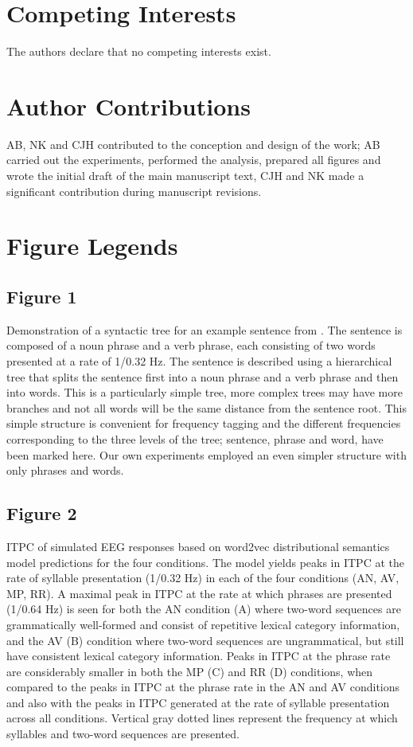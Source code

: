 \documentclass[10pt,letterpaper]{article}
\begin{document}
\section*{Competing Interests}
The authors declare that no competing interests exist.




\section*{Author Contributions}
AB, NK and CJH contributed to the conception and design of the work; AB carried out the experiments, performed the analysis, prepared all figures and wrote the initial draft of the main manuscript text, CJH and NK made a significant contribution during manuscript revisions.


\section*{Figure Legends}

\subsection*{Figure 1}

Demonstration of a syntactic tree for an example sentence from \cite{DingEtAl2016, DingEtAl2017}. The sentence is composed of a noun phrase and a verb phrase, each consisting of two words presented at a rate of 1/0.32 Hz.  The sentence is described using a hierarchical tree that splits the sentence first into a noun phrase and a verb phrase and then into words. This is a particularly simple tree, more complex trees may have more branches and not all words will be the same distance from the sentence root. This simple structure is convenient for frequency tagging and the different frequencies corresponding to the three levels of the tree; sentence, phrase and word, have been marked here. Our own experiments employed an even simpler structure with only phrases and words.

\subsection*{Figure 2}
ITPC of simulated EEG responses based on word2vec distributional semantics model predictions for the four conditions. The model yields peaks in ITPC at the rate of syllable presentation (1/0.32 Hz) in each of the four conditions (AN, AV, MP, RR). A maximal peak in ITPC at the rate at which phrases are presented (1/0.64 Hz) is seen for both the AN condition (A) where two-word sequences are grammatically well-formed and consist of repetitive lexical category information, and the AV (B) condition where two-word sequences are ungrammatical, but still have consistent lexical category information. Peaks in ITPC at the phrase rate are considerably smaller in both the MP (C) and RR (D) conditions, when compared to the peaks in ITPC at the phrase rate in the AN and AV conditions and also with the peaks in ITPC generated at the rate of syllable presentation across all conditions. Vertical gray dotted lines represent the frequency at which syllables and two-word sequences are presented.
\end{document}
